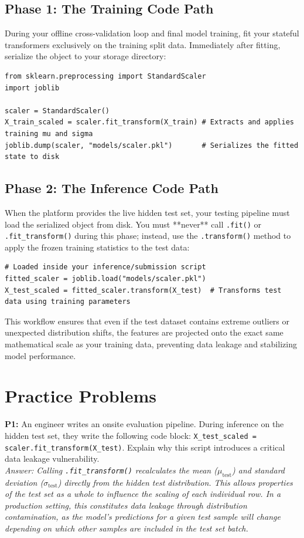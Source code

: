 \documentclass{article}
\begin{document}
\subsection{Phase 1: The Training Code Path}
During your offline cross-validation loop and final model training, fit your stateful transformers exclusively on the training split data. Immediately after fitting, serialize the object to your storage directory:
\begin{verbatim}
from sklearn.preprocessing import StandardScaler
import joblib

scaler = StandardScaler()
X_train_scaled = scaler.fit_transform(X_train) # Extracts and applies training mu and sigma
joblib.dump(scaler, "models/scaler.pkl")       # Serializes the fitted state to disk
\end{verbatim}

\subsection{Phase 2: The Inference Code Path}
When the platform provides the live hidden test set, your testing pipeline must load the serialized object from disk. You must **never** call \texttt{.fit()} or \texttt{.fit\_transform()} during this phase; instead, use the \texttt{.transform()} method to apply the frozen training statistics to the test data:
\begin{verbatim}
# Loaded inside your inference/submission script
fitted_scaler = joblib.load("models/scaler.pkl")
X_test_scaled = fitted_scaler.transform(X_test)  # Transforms test data using training parameters
\end{verbatim}
This workflow ensures that even if the test dataset contains extreme outliers or unexpected distribution shifts, the features are projected onto the exact same mathematical scale as your training data, preventing data leakage and stabilizing model performance.

\newpage
\section{Practice Problems}

\textbf{P1:} An engineer writes an onsite evaluation pipeline. During inference on the hidden test set, they write the following code block: \texttt{X\_test\_scaled = scaler.fit\_transform(X\_test)}. Explain why this script introduces a critical data leakage vulnerability.
\\
\textit{Answer: Calling \texttt{.fit\_transform()} recalculates the mean ($\mu_{\text{test}}$) and standard deviation ($\sigma_{\text{test}}$) directly from the hidden test distribution. This allows properties of the test set as a whole to influence the scaling of each individual row. In a production setting, this constitutes data leakage through distribution contamination, as the model's predictions for a given test sample will change depending on which other samples are included in the test set batch.}
\end{document}
